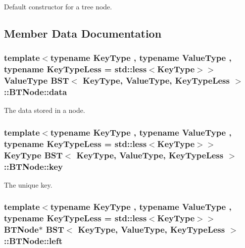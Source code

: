 Default constructor for a tree node. 



\subsection{Member Data Documentation}
\subsubsection[{\texorpdfstring{data}{data}}]{\setlength{\rightskip}{0pt plus 5cm}template$<$typename Key\+Type , typename Value\+Type , typename Key\+Type\+Less  = std\+::less$<$\+Key\+Type$>$$>$ Value\+Type {\bf B\+ST}$<$ Key\+Type, Value\+Type, Key\+Type\+Less $>$\+::B\+T\+Node\+::data}\hypertarget{struct_b_s_t_1_1_b_t_node_ac081727fd869b860d3efba78d0432663}{}\label{struct_b_s_t_1_1_b_t_node_ac081727fd869b860d3efba78d0432663}


The data stored in a node. 

\subsubsection[{\texorpdfstring{key}{key}}]{\setlength{\rightskip}{0pt plus 5cm}template$<$typename Key\+Type , typename Value\+Type , typename Key\+Type\+Less  = std\+::less$<$\+Key\+Type$>$$>$ Key\+Type {\bf B\+ST}$<$ Key\+Type, Value\+Type, Key\+Type\+Less $>$\+::B\+T\+Node\+::key}\hypertarget{struct_b_s_t_1_1_b_t_node_a0650926b6e3a4e2395bdadb5d6fefe44}{}\label{struct_b_s_t_1_1_b_t_node_a0650926b6e3a4e2395bdadb5d6fefe44}


The unique key. 

\subsubsection[{\texorpdfstring{left}{left}}]{\setlength{\rightskip}{0pt plus 5cm}template$<$typename Key\+Type , typename Value\+Type , typename Key\+Type\+Less  = std\+::less$<$\+Key\+Type$>$$>$ {\bf B\+T\+Node}$\ast$ {\bf B\+ST}$<$ Key\+Type, Value\+Type, Key\+Type\+Less $>$\+::B\+T\+Node\+::left}\hypertarget{struct_b_s_t_1_1_b_t_node_ae0580d57138729a9b6b7644d25abd024}{}\label{struct_b_s_t_1_1_b_t_node_ae0580d57138729a9b6b7644d25abd024}



